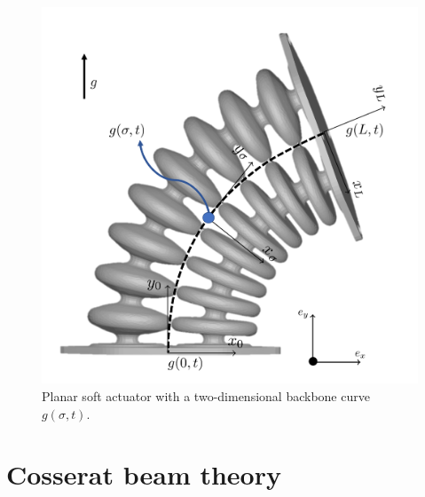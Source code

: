 \begin{figure}[H]
\begin{minipage}{.5\textwidth}
    \includegraphics[width=\textwidth]{Figures/Chapter2/actuatorschematic.png}
    \vspace{15pt}
    \caption{Planar soft actuator with a two-dimensional backbone curve $g(\sigma,t)$.}
    \label{fig2:kinematicschematic}
\end{minipage}
\end{figure}





\section{Cosserat beam theory}

